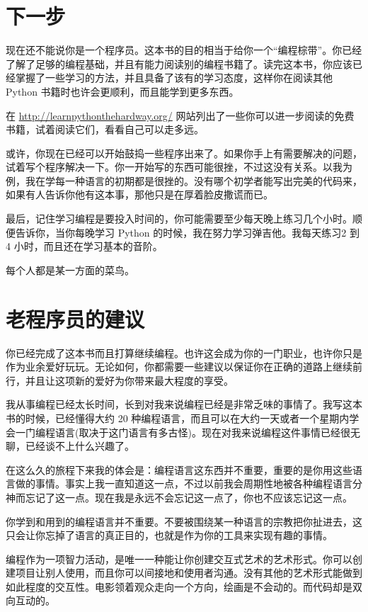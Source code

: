 \section*{下一步} %
\label{sec:下一步}
现在还不能说你是一个程序员。这本书的目的相当于给你一个“编程棕带”。你已经了解了足够的编程基础，并且有能力阅读别的编程书籍了。读完这本书，你应该已经掌握了一些学习的方法，并且具备了该有的学习态度，这样你在阅读其他 Python 书籍时也许会更顺利，而且能学到更多东西。

在 \url{http://learnpythonthehardway.org/} 网站列出了一些你可以进一步阅读的免费书籍，试着阅读它们，看看自己可以走多远。

或许，你现在已经可以开始鼓捣一些程序出来了。如果你手上有需要解决的问题，试着写个程序解决一下。你一开始写的东西可能很挫，不过这没有关系。以我为例，我在学每一种语言的初期都是很挫的。没有哪个初学者能写出完美的代码来，如果有人告诉你他有这本事，那他只是在厚着脸皮撒谎而已。

最后，记住学习编程是要投入时间的，你可能需要至少每天晚上练习几个小时。顺便告诉你，当你每晚学习 Python 的时候，我在努力学习弹吉他。我每天练习2 到 4 小时，而且还在学习基本的音阶。

每个人都是某一方面的菜鸟。
\section*{老程序员的建议} %
\label{sec:老程序员的建议}
你已经完成了这本书而且打算继续编程。也许这会成为你的一门职业，也许你只是作为业余爱好玩玩。无论如何，你都需要一些建议以保证你在正确的道路上继续前行，并且让这项新的爱好为你带来最大程度的享受。

我从事编程已经太长时间，长到对我来说编程已经是非常乏味的事情了。我写这本书的时候，已经懂得大约 20 种编程语言，而且可以在大约一天或者一个星期内学会一门编程语言(取决于这门语言有多古怪)。现在对我来说编程这件事情已经很无聊，已经谈不上什么兴趣了。

在这么久的旅程下来我的体会是：编程语言这东西并不重要，重要的是你用这些语言做的事情。事实上我一直知道这一点，不过以前我会周期性地被各种编程语言分神而忘记了这一点。现在我是永远不会忘记这一点了，你也不应该忘记这一点。

你学到和用到的编程语言并不重要。不要被围绕某一种语言的宗教把你扯进去，这只会让你忘掉了语言的真正目的，也就是作为你的工具来实现有趣的事情。

编程作为一项智力活动，是唯一一种能让你创建交互式艺术的艺术形式。你可以创建项目让别人使用，而且你可以间接地和使用者沟通。没有其他的艺术形式能做到如此程度的交互性。电影领着观众走向一个方向，绘画是不会动的。而代码却是双向互动的。

